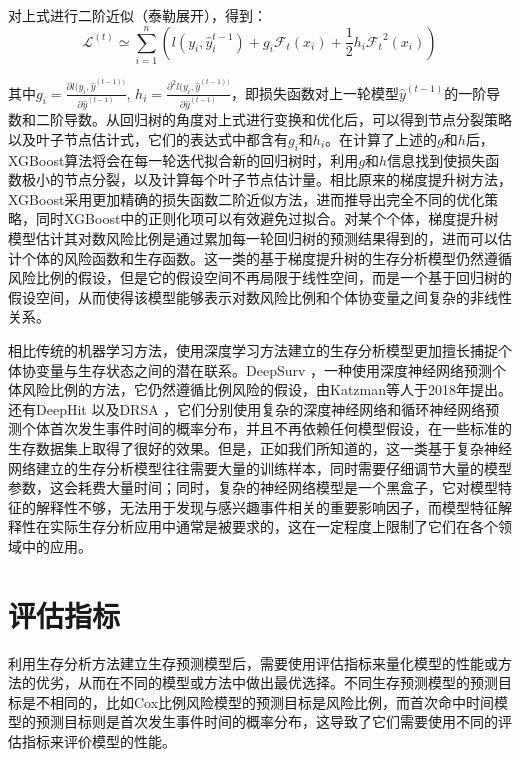 对上式进行二阶近似（泰勒展开），得到： 
\begin{equation}
\mathcal{L}^{(t)} \simeq \sum_{i=1}^n \left( l(y_i, \hat{y}_i^{t-1})+g_i\mathcal{F}_t(x_i)+\frac{1}{2} h_i {\mathcal{F}_t}^2 (x_i) \right) \label{F12}
\end{equation}

其中$g_i=\frac{\partial l(y_i, \hat{y}^{(t-1))}}{\partial \hat{y}^{(t-1)}}$, $h_i=\frac{\partial^2 l(y_i, \hat{y}^{(t-1))}}{\partial \hat{y}^{(t-1)}}$，即损失函数对上一轮模型$\hat{y}^{(t-1)}$的一阶导数和二阶导数。从回归树的角度对上式进行变换和优化后，可以得到节点分裂策略以及叶子节点估计式，它们的表达式中都含有$g_i$和$h_i$。在计算了上述的$g$和$h$后，XGBoost算法将会在每一轮迭代拟合新的回归树时，利用$g$和$h$信息找到使损失函数极小的节点分裂，以及计算每个叶子节点估计量。相比原来的梯度提升树方法，XGBoost采用更加精确的损失函数二阶近似方法，进而推导出完全不同的优化策略，同时XGBoost中的正则化项可以有效避免过拟合。对某个个体，梯度提升树模型估计其对数风险比例是通过累加每一轮回归树的预测结果得到的，进而可以估计个体的风险函数和生存函数。这一类的基于梯度提升树的生存分析模型仍然遵循风险比例的假设，但是它的假设空间不再局限于线性空间，而是一个基于回归树的假设空间，从而使得该模型能够表示对数风险比例和个体协变量之间复杂的非线性关系。

相比传统的机器学习方法，使用深度学习方法建立的生存分析模型更加擅长捕捉个体协变量与生存状态之间的潜在联系。DeepSurv ，一种使用深度神经网络预测个体风险比例的方法，它仍然遵循比例风险的假设，由Katzman等人于2018年提出。还有DeepHit 以及DRSA ，它们分别使用复杂的深度神经网络和循环神经网络预测个体首次发生事件时间的概率分布，并且不再依赖任何模型假设，在一些标准的生存数据集上取得了很好的效果。但是，正如我们所知道的，这一类基于复杂神经网络建立的生存分析模型往往需要大量的训练样本，同时需要仔细调节大量的模型参数，这会耗费大量时间；同时，复杂的神经网络模型是一个黑盒子，它对模型特征的解释性不够，无法用于发现与感兴趣事件相关的重要影响因子，而模型特征解释性在实际生存分析应用中通常是被要求的，这在一定程度上限制了它们在各个领域中的应用。

\section{评估指标}

利用生存分析方法建立生存预测模型后，需要使用评估指标来量化模型的性能或方法的优劣，从而在不同的模型或方法中做出最优选择。不同生存预测模型的预测目标是不相同的，比如Cox比例风险模型的预测目标是风险比例，而首次命中时间模型的预测目标则是首次发生事件时间的概率分布，这导致了它们需要使用不同的评估指标来评价模型的性能。


